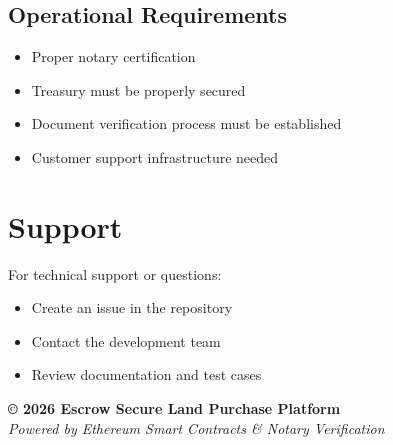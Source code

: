 \documentclass[12pt,a4paper]{article}
\begin{document}
\subsection{Operational Requirements}
\begin{itemize}
\item Proper notary certification
\item Treasury must be properly secured
\item Document verification process must be established
\item Customer support infrastructure needed
\end{itemize}

\section{Support}

For technical support or questions:
\begin{itemize}
\item Create an issue in the repository
\item Contact the development team
\item Review documentation and test cases
\end{itemize}

\vfill
\begin{center}
\textbf{© 2026 Escrow Secure Land Purchase Platform} \\
\textit{Powered by Ethereum Smart Contracts \& Notary Verification}
\end{center}
\end{document}
